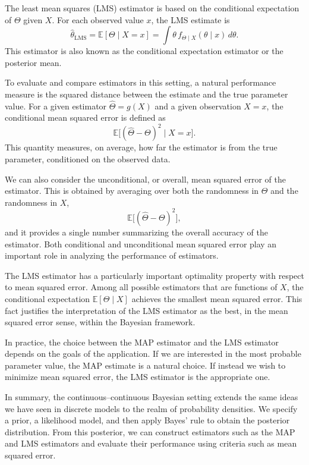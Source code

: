 The least mean squares (LMS) estimator is based on the conditional expectation of \(\Theta\) given \(X\).  
For each observed value \(x\), the LMS estimate is
\[
\hat{\theta}_{\text{LMS}}
=
\mathbb{E}[\Theta \mid X = x]
=
\int \theta \, f_{\Theta \mid X}(\theta \mid x)\,d\theta.
\]
This estimator is also known as the conditional expectation estimator or the posterior mean.  

To evaluate and compare estimators in this setting, a natural performance measure is the squared distance between the estimate and the true parameter value.  
For a given estimator \(\hat{\Theta} = g(X)\) and a given observation \(X = x\), the conditional mean squared error is defined as
\[
\mathbb{E}\big[(\hat{\Theta} - \Theta)^{2} \mid X = x\big].
\]
This quantity measures, on average, how far the estimator is from the true parameter, conditioned on the observed data.  

We can also consider the unconditional, or overall, mean squared error of the estimator.  
This is obtained by averaging over both the randomness in \(\Theta\) and the randomness in \(X\),
\[
\mathbb{E}\big[(\hat{\Theta} - \Theta)^{2}\big],
\]
and it provides a single number summarizing the overall accuracy of the estimator.  
Both conditional and unconditional mean squared error play an important role in analyzing the performance of estimators.  

The LMS estimator has a particularly important optimality property with respect to mean squared error.  
Among all possible estimators that are functions of \(X\), the conditional expectation \(\mathbb{E}[\Theta \mid X]\) achieves the smallest mean squared error.  
This fact justifies the interpretation of the LMS estimator as the best, in the mean squared error sense, within the Bayesian framework.  

In practice, the choice between the MAP estimator and the LMS estimator depends on the goals of the application.  
If we are interested in the most probable parameter value, the MAP estimate is a natural choice.  
If instead we wish to minimize mean squared error, the LMS estimator is the appropriate one.  

In summary, the continuous–continuous Bayesian setting extends the same ideas we have seen in discrete models to the realm of probability densities.  
We specify a prior, a likelihood model, and then apply Bayes' rule to obtain the posterior distribution.  
From this posterior, we can construct estimators such as the MAP and LMS estimators and evaluate their performance using criteria such as mean squared error.

